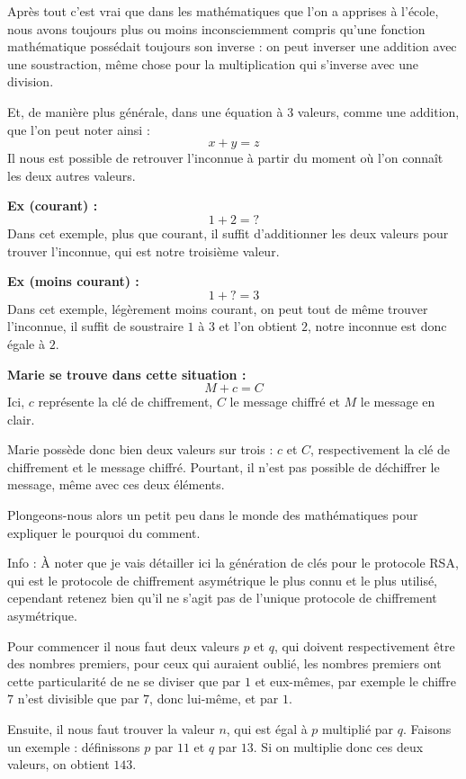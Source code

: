 \documentclass[
  paper=a4,
  ,captions=tableheading
]{scrartcl}
\renewenvironment{quote}{\begin{customblockquote}\list{}{\rightmargin=0em\leftmargin=0em}%
\item\relax\color{blockquote-text}\ignorespaces}{\unskip\unskip\endlist\end{customblockquote}}
\begin{document}
Après tout c'est vrai que dans les mathématiques que l'on a apprises à
l'école, nous avons toujours plus ou moins inconsciemment compris qu'une
fonction mathématique possédait toujours son inverse : on peut inverser
une addition avec une soustraction, même chose pour la multiplication
qui s'inverse avec une division.

Et, de manière plus générale, dans une équation à 3 valeurs, comme une
addition, que l'on peut noter ainsi : \[
x + y = z
\] Il nous est possible de retrouver l'inconnue à partir du moment où
l'on connaît les deux autres valeurs.

\textbf{Ex (courant) :} \[
1+2=?
\] Dans cet exemple, plus que courant, il suffit d'additionner les deux
valeurs pour trouver l'inconnue, qui est notre troisième valeur.

\textbf{Ex (moins courant) :} \[
1+?=3
\] Dans cet exemple, légèrement moins courant, on peut tout de même
trouver l'inconnue, il suffit de soustraire \(1\) à \(3\) et l'on
obtient \(2\), notre inconnue est donc égale à \(2\).

\textbf{Marie se trouve dans cette situation :} \[
M+c=C
\] Ici, \(c\) représente la clé de chiffrement, \(C\) le message chiffré
et \(M\) le message en clair.

Marie possède donc bien deux valeurs sur trois : \(c\) et \(C\),
respectivement la clé de chiffrement et le message chiffré. Pourtant, il
n'est pas possible de déchiffrer le message, même avec ces deux
éléments.

Plongeons-nous alors un petit peu dans le monde des mathématiques pour
expliquer le pourquoi du comment.

\begin{quote}
Info : À noter que je vais détailler ici la génération de clés pour le
protocole RSA, qui est le protocole de chiffrement asymétrique le plus
connu et le plus utilisé, cependant retenez bien qu'il ne s'agit pas de
l'unique protocole de chiffrement asymétrique.
\end{quote}

Pour commencer il nous faut deux valeurs \(p\) et \(q\), qui doivent
respectivement être des nombres premiers, pour ceux qui auraient oublié,
les nombres premiers ont cette particularité de ne se diviser que par
\(1\) et eux-mêmes, par exemple le chiffre \(7\) n'est divisible que par
\(7\), donc lui-même, et par \(1\).

Ensuite, il nous faut trouver la valeur \(n\), qui est égal à \(p\)
multiplié par \(q\). Faisons un exemple : définissons \(p\) par \(11\)
et \(q\) par \(13\). Si on multiplie donc ces deux valeurs, on obtient
\(143\).
\end{document}
